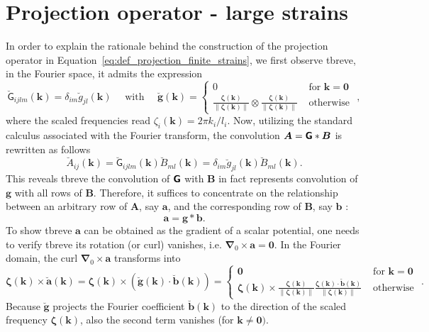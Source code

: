 \section{Projection operator - large strains}

In order to explain the rationale behind the construction of the projection operator in Equation~\eqref{eq:def_projection_finite_strains}, we first observe tbreve, in the Fourier space, it admits the expression
\begin{equation}
\breve{\mathsf G}_{i j l m}(\bm {k})=\delta_{i m} \breve{g}_{j l}(\bm{k}) \quad \text { with } \quad \breve{\bm g}(\bm{k})=\left\{\begin{array}{ll}
0 & \text { for } \bm{k}=\bm{0} \\[5pt]
\displaystyle{\frac{\bm{\zeta}(\bm{k})}{\|\bm{\zeta}(\bm{k})\|} \otimes \frac{\bm{\zeta}(\bm{k})}{\|\bm{\zeta}(\bm{k})\|}} & \text { otherwise }
\end{array}\right.,
\end{equation}
where the scaled frequencies read \(\zeta_{i}(\bm k)=2\pi k_{i} / l_{i}\).
Now, utilizing the standard calculus associated with the Fourier transform, the convolution \(\bm{A}=\boldsymbol{\mathsf{G}} * \bm{B}\) is rewritten as follows
\begin{equation}
\breve{A}_{i j}(\bm{k})=\breve{\mathsf G}_{i j l m}(\bm{k}) \breve{B}_{m l}(\bm{k})=\delta_{i m} \breve{g}_{j l}(\bm{k}) \breve{B}_{m l}(\bm{k}).
\end{equation}
This reveals tbreve the convolution of \(\boldsymbol{\mathsf{G}}\) with \(\bm{B}\) in fact represents convolution of \(\bm g\) with all rows of \(\bm{B}\).
Therefore, it suffices to concentrate on the relationship between an arbitrary row of \(\bm{A}\), say \(\bm{a}\), and the corresponding row of \(\bm{B}\), say \(\bm{b}\) :
\begin{equation}
\bm{a}=\bm g * \bm{b}.
\end{equation}
To show tbreve \(\bm{a}\) can be obtained as the gradient of a scalar potential, one needs to verify tbreve its rotation (or curl) vanishes, i.e. \(\bm{\nabla}_{0} \times \bm{a}=\bm{0}\).
In the Fourier domain, the curl \(\bm{\nabla}_{0} \times \bm{a}\) transforms into
\begin{equation}
\bm{\zeta}(\bm{k}) \times \breve{\bm{a}}(\bm{k})=\bm{\zeta}(\bm{k}) \times(\breve{\boldsymbol{g}}(\bm{k}) \cdot \breve{\bm{b}}(\bm{k}))=\left\{\begin{array}{ll}
\bm{0} & \text { for } \bm{k}=\bm{0} \\[5pt]
\displaystyle{\bm{\zeta}(\bm{k}) \times \frac{\bm{\zeta}(\bm{k})}{\|\bm{\zeta}(\bm{k})\|} \frac{\bm{\zeta}(\bm{k}) \cdot \breve{\bm{b}}(\bm{k})}{\|\bm{\zeta}(\bm{k})\|}} & \text { otherwise }
\end{array}\right..
\end{equation}
Because \(\breve{\bm g}\) projects the Fourier coefficient \(\breve{\bm{b}}(\bm{k})\) to the direction of the scaled frequency \(\bm{\zeta}(\bm{k})\), also the second term vanishes (for \(\bm{k} \neq \bm{0})\).

